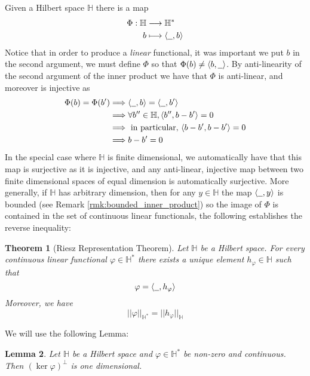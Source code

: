 \documentclass[12pt]{article}
\theoremstyle{plain}
\newtheorem{thm}{Theorem}[subsection] %
\newtheorem{lemma}[thm]{Lemma}
\theoremstyle{definition}
\newcommand{\bb}[1]{\mathbb{#1}}
\newcommand{\und}[1]{\underline{\hspace{#1 cm}}}
\newcommand{\lto}{\longrightarrow}
\begin{document}
Given a Hilbert space $\bb{H}$ there is a map
\begin{align}
    \Phi: \bb{H} &\lto \bb{H}^\ast\label{eq:Riesz_map}\\
    b &\longmapsto \langle \und{0.2}, b \rangle
\end{align}
Notice that in order to produce a \emph{linear} functional, it was important we put $b$ in the second argument, we must define $\Phi$ so that $\Phi(b) \neq \langle b, \und{0.2}\rangle$. By anti-linearity of the second argument of the inner product we have that $\Phi$ is anti-linear, and moreover is injective as
\begin{align*}
    \Phi(b) = \Phi(b') &\Longrightarrow \langle \und{0.2}, b\rangle = \langle \und{0.2}, b'\rangle\\
    &\Longrightarrow \forall b'' \in \bb{H}, \langle b'', b - b'\rangle = 0\\
    &\Longrightarrow \text{ in particular, } \langle b-b', b-b'\rangle = 0\\
    &\Longrightarrow b - b' = 0
\end{align*}
In the special case where $\bb{H}$ is finite dimensional, we automatically have that this map is surjective as it is injective, and any anti-linear, injective map between two finite dimensional spaces of equal dimension is automatically surjective. More generally, if $\bb{H}$ has arbitrary dimension, then for any $y \in \bb{H}$ the map $\langle \und{0.2},y\rangle$ is bounded (see Remark \ref{rmk:bounded_inner_product}) so the image of $\Phi$ is contained in the set of continuous linear functionals, the following establishes the reverse inequality:
\begin{thm}[Riesz Representation Theorem]\label{thm:riesz}
Let $\bb{H}$ be a Hilbert space. For every continuous linear functional $\varphi \in \bb{H}^\ast$ there exists a unique element $h_\varphi \in \bb{H}$ such that
\begin{equation}
    \varphi = \langle \und{0.2}, h_\varphi \rangle
\end{equation}
Moreover, we have
\begin{equation}
    ||\varphi||_{\bb{H}^\ast} = ||h_\varphi||_{\bb{H}}
\end{equation}
\end{thm}
We will use the following Lemma:
\begin{lemma}\label{lem:one_dim_kernel}
Let $\bb{H}$ be a Hilbert space and $\varphi \in \bb{H}^\ast$ be non-zero and continuous. Then $(\operatorname{ker}\varphi)^\perp$ is one dimensional.
\end{lemma}
\end{document}
